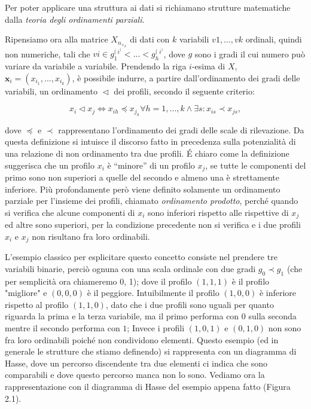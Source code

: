 \documentclass{report}
\begin{document}
Per poter applicare una struttura ai dati si richiamano strutture matematiche dalla \textit{teoria degli ordinamenti parziali}.

Ripensiamo ora alla matrice $X_n_\times_k$ di dati con $k$ variabili $v1, ..., vk$ ordinali, quindi non numeriche, tali che $vi \in g_1^(^i^)<...< g_h^(^i^)$, dove $g$ sono i gradi il cui numero può variare da variabile a variabile. Prendendo la riga $i$-esima di $X$, $\textbf{x}_i=(x_i_1, ..., x_i_k)$, è possibile indurre, a partire dall'ordinamento dei gradi delle variabili, un ordinamento $\vartriangleleft$ dei profili, secondo il seguente criterio:

\[x_i \lhd x_j \Leftrightarrow x_{ih} \preceq x_j_h   \forall  h=1,...,k \land \exists s:x_{is} \prec x_{js},\]

dove $\preceq$ e $\prec$ rappresentano l'ordinamento dei gradi delle scale di rilevazione. Da questa definizione si intuisce il discorso fatto in precedenza sulla potenzialità di una relazione di non ordinamento tra due profili. É chiaro come la definizione suggerisca che un profilo $x_i$ è “minore” di un profilo $x_j$, se tutte le componenti del primo sono non superiori a quelle del secondo e almeno una è strettamente inferiore. Più profondamente però viene definito solamente un ordinamento parziale per l'insieme dei profili, chiamato \textit{ordinamento prodotto}, perché quando si verifica che alcune componenti di $x_i$ sono inferiori rispetto alle rispettive di $x_j$ ed altre sono superiori, per la condizione precedente non si verifica e i due profili $x_i$ e $x_j$ non risultano fra loro ordinabili.


L'esempio classico per esplicitare questo concetto consiste nel prendere tre variabili binarie, perciò ognuna con una scala ordinale con due gradi $g_0 \prec g_1$ (che per semplicità ora chiameremo 0, 1); dove il profilo $(1,1,1)$ è il profilo "migliore" e $(0,0,0)$ è il peggiore. Intuibilmente il profilo $(1,0,0)$ è inferiore rispetto al profilo $(1,1,0)$, dato che i due profili sono uguali per quanto riguarda la prima e la terza variabile, ma il primo performa con $0$ sulla seconda mentre il secondo performa con $1$; Invece i profili $(1,0,1)$ e $(0,1,0)$ non sono fra loro ordinabili poiché non condividono elementi. Questo esempio (ed in generale le strutture che stiamo definendo) si rappresenta con un diagramma di Hasse, dove un percorso discendente tra due elementi ci indica che sono comparabili e dove questo percorso manca non lo sono. Vediamo ora la rappresentazione con il diagramma di Hasse del esempio appena fatto (Figura 2.1). 
\end{document}
